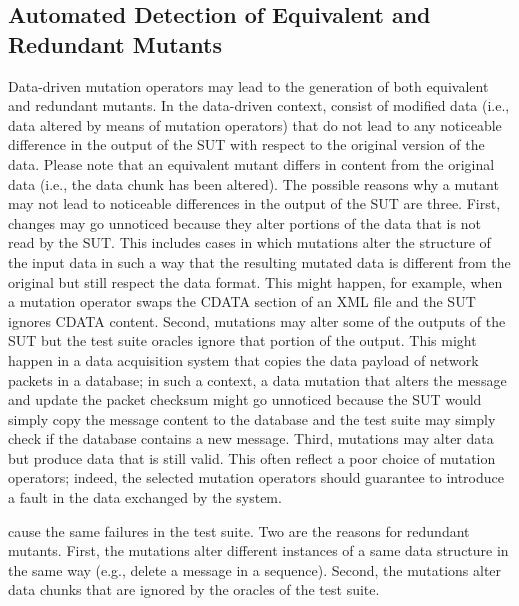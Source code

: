 
\subsection{Automated Detection of Equivalent and Redundant Mutants}
\label{sec:dataequivalent}

Data-driven mutation operators may lead to the generation of both equivalent and redundant mutants.
In the data-driven context,  consist of modified data (i.e., data altered by means of mutation operators) that do not lead to any noticeable difference in the output of the SUT with respect to the original version of the data.
Please note that an equivalent mutant differs in content from the original data (i.e., the data chunk has been altered).
The possible reasons why a mutant may not lead to noticeable differences in the output of the SUT are three. First, changes may go unnoticed because they alter portions of the data that is not read by the SUT. This includes cases in which mutations alter the structure of the input data in such a way that the resulting mutated data is different from the original but still respect the data format. This might happen, for example, when a mutation operator swaps the CDATA section of an XML file and the SUT ignores CDATA content. Second, mutations may alter some of the outputs of the SUT but the test suite oracles ignore that portion of the output. This might happen in a data acquisition system that copies the data payload of network packets in a database; in such a context, a data mutation that alters the message and update the packet checksum might go unnoticed because the SUT would simply copy the message content to the database and the test suite may simply check if the database contains a new message. Third, mutations may alter data but produce data that is still valid. This often reflect a poor choice of mutation operators; indeed, the selected mutation operators should guarantee to introduce a fault in the data exchanged by the system.




 cause the same failures in the test suite. Two are the reasons for redundant mutants. First, the mutations alter different instances of a same data structure in the same way (e.g., delete a message in a sequence). Second, the mutations alter data chunks that are ignored by the oracles of the test suite.



